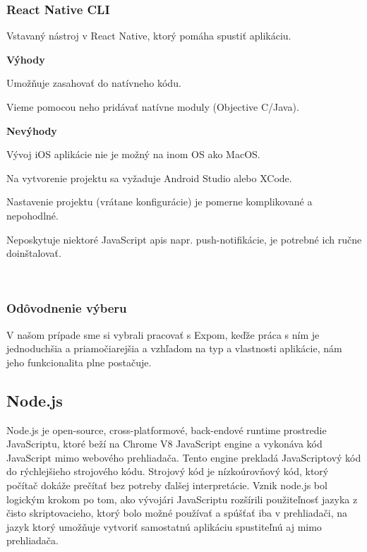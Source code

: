\subsubsection{React Native CLI}
Vstavaný nástroj v React Native, ktorý pomáha spustiť aplikáciu. \newline

{\bf Výhody}
\begin{itemize}
{\item Umožňuje zasahovať do natívneho kódu.} 
{\item Vieme pomocou neho pridávať natívne moduly (Objective C/Java).} \cite{rncli} 
\end{itemize}

{\bf Nevýhody}
\begin{itemize}
{\item Vývoj iOS aplikácie nie je možný na inom OS ako MacOS.} 
{\item Na vytvorenie projektu sa vyžaduje Android Studio alebo XCode.}
{\item Nastavenie projektu (vrátane konfigurácie) je pomerne komplikované a nepohodlné.} 
{\item Neposkytuje niektoré JavaScript \acrshort{api}s napr. push-notifikácie, je potrebné ich ručne doinštalovať.} \cite{rncli} \\
\end{itemize}

\subsubsection{Odôvodnenie výberu}
V našom prípade sme si vybrali pracovať s Expom, keďže práca s ním je jednoduchšia a priamočiarejšia a vzhľadom na typ a vlastnosti aplikácie, nám jeho funkcionalita plne postačuje. \\

\subsection{Node.js}
Node.js je open-source, cross-platformové, back-endové runtime prostredie JavaScriptu, ktoré beží na Chrome V8 JavaScript engine a vykonáva kód JavaScript mimo webového prehliadača. \cite{nodejswiki} Tento engine prekladá JavaScriptový kód do rýchlejšieho strojového kódu. Strojový kód je nízkoúrovňový kód, ktorý počítač dokáže prečítať bez potreby ďalšej interpretácie. Vznik node.js bol logickým krokom po tom, ako vývojári JavaScriptu rozšírili použiteľnosť jazyka z čisto skriptovacieho, ktorý bolo možné používať a spúšťať iba v prehliadači, na jazyk ktorý umožňuje vytvoriť samostatnú aplikáciu spustiteľnú aj mimo prehliadača. 

